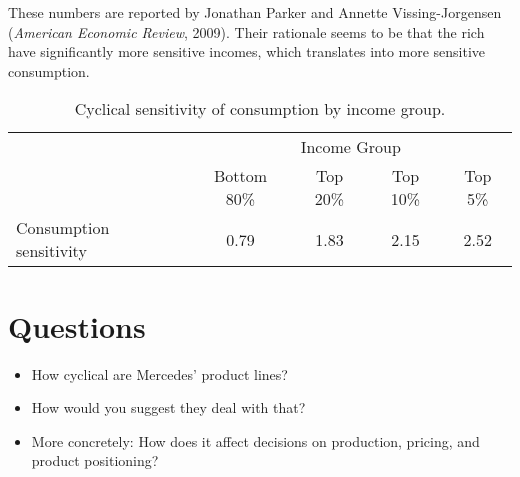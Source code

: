 \documentclass[letterpaper,12pt]{article}
\begin{document}
These numbers are reported by Jonathan Parker and Annette Vissing-Jorgensen
({\it American Economic Review\/}, 2009).
Their rationale seems to be that the rich have significantly more
sensitive incomes, which translates into more sensitive consumption.

\begin{table}[h]
\begin{center}
\tabcolsep=0.1in
\begin{tabular}{lcccc}
\toprule
    &  \multicolumn{4}{c}{Income Group} \\
        \cmidrule(r){2-5}
    &  Bottom 80\%  &  Top 20\% & Top 10\%  &  Top 5\%  \\
\midrule
Consumption sensitivity &  0.79 & 1.83 & 2.15 & 2.52 \\
\bottomrule
\end{tabular}

\caption{Cyclical sensitivity of consumption by income group.}
\end{center}
\end{table}


\section{Questions}

\begin{itemize}
\item How cyclical are Mercedes' product lines?

\item How would you suggest they deal with that?

\item More concretely:  How does it affect decisions on production,
pricing, and product positioning?
\end{itemize}


\end{document}
